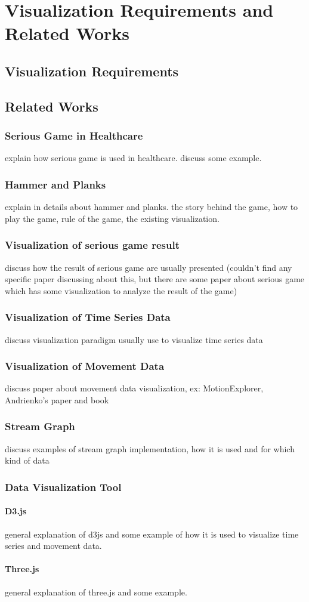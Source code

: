 \chapter{Visualization Requirements and Related Works}
\label{chap:back}

\section{Visualization Requirements}
\section{Related Works}
\subsection{Serious Game in Healthcare}
explain how serious game is used in healthcare. discuss some example.
\subsection{Hammer and Planks}
explain in details about hammer and planks. the story behind the game, how to play the game, rule of the game, the existing visualization.
\subsection{Visualization of serious game result} 
discuss how the result of serious game are usually presented (couldn't find any specific paper discussing about this, but there are some paper about serious game which has some visualization to analyze the result of the game)
\subsection{Visualization of Time Series Data}
discuss visualization paradigm usually use to visualize time series data
\subsection{Visualization of Movement Data}
discuss paper about movement data visualization, ex: MotionExplorer, Andrienko's paper and book
\subsection{Stream Graph}
discuss examples of stream graph implementation, how it is used and for which kind of data

\subsection{Data Visualization Tool}
\subsubsection{D3.js}
general explanation of d3js and some example of how it is used to visualize time series and movement data.

\subsubsection{Three.js}
general explanation of three.js and some example.

